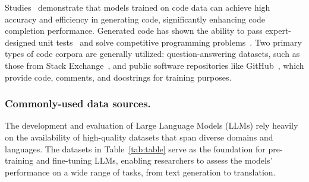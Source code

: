\begin{itemize}
{		      Studies~\cite{chen2021evaluating, austin2021program} demonstrate that models trained on code data can achieve high accuracy and efficiency in generating code, significantly enhancing code completion performance. Generated code has shown the ability to pass expert-designed unit tests~\cite{chen2021evaluating} and solve competitive programming problems~\cite{li2022competition}.
		      Two primary types of code corpora are generally utilized: question-answering datasets, such as those from Stack Exchange~\cite{xu2022systematic}, and public software repositories like GitHub~\cite{chen2021evaluating}, which provide code, comments, and docstrings for training purposes.
	      }
\end{itemize}

\subsubsection{Commonly-used data sources.}
\label{subsubsec:commonly-used-data-sources}

The development and evaluation of Large Language Models (LLMs) rely heavily on the availability of high-quality datasets that span diverse domains and languages.
The datasets in Table~\ref{tab:table} serve as the foundation for pre-training and fine-tuning LLMs, enabling researchers to assess the models' performance on a wide range of tasks, from text generation to translation.\\

